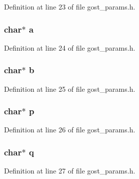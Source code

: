 Definition at line 23 of file gost\+\_\+params.\+h.

\subsubsection[{\texorpdfstring{a}{a}}]{\setlength{\rightskip}{0pt plus 5cm}char$\ast$ a}\hypertarget{struct_r3410__2001_ae46bdd7e2214e709576b46f5282340b8}{}\label{struct_r3410__2001_ae46bdd7e2214e709576b46f5282340b8}


Definition at line 24 of file gost\+\_\+params.\+h.

\subsubsection[{\texorpdfstring{b}{b}}]{\setlength{\rightskip}{0pt plus 5cm}char$\ast$ b}\hypertarget{struct_r3410__2001_aafe80d64508a05a94be4d07b648244d0}{}\label{struct_r3410__2001_aafe80d64508a05a94be4d07b648244d0}


Definition at line 25 of file gost\+\_\+params.\+h.

\subsubsection[{\texorpdfstring{p}{p}}]{\setlength{\rightskip}{0pt plus 5cm}char$\ast$ p}\hypertarget{struct_r3410__2001_aaa1ebe818ec1c763a776cc580551f3e6}{}\label{struct_r3410__2001_aaa1ebe818ec1c763a776cc580551f3e6}


Definition at line 26 of file gost\+\_\+params.\+h.

\subsubsection[{\texorpdfstring{q}{q}}]{\setlength{\rightskip}{0pt plus 5cm}char$\ast$ q}\hypertarget{struct_r3410__2001_a5d2b44119a969086f33b7b0e909c3cdc}{}\label{struct_r3410__2001_a5d2b44119a969086f33b7b0e909c3cdc}


Definition at line 27 of file gost\+\_\+params.\+h.

